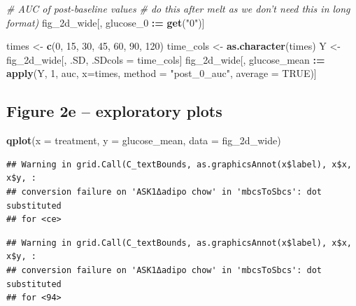 \documentclass[]{book}
\newenvironment{Shaded}{\begin{snugshade}}{\end{snugshade}}
\newcommand{\CommentTok}[1]{\textcolor[rgb]{0.56,0.35,0.01}{\textit{#1}}}
\newcommand{\DataTypeTok}[1]{\textcolor[rgb]{0.13,0.29,0.53}{#1}}
\newcommand{\DecValTok}[1]{\textcolor[rgb]{0.00,0.00,0.81}{#1}}
\newcommand{\ErrorTok}[1]{\textcolor[rgb]{0.64,0.00,0.00}{\textbf{#1}}}
\newcommand{\KeywordTok}[1]{\textcolor[rgb]{0.13,0.29,0.53}{\textbf{#1}}}
\newcommand{\NormalTok}[1]{#1}
\newcommand{\OperatorTok}[1]{\textcolor[rgb]{0.81,0.36,0.00}{\textbf{#1}}}
\newcommand{\OtherTok}[1]{\textcolor[rgb]{0.56,0.35,0.01}{#1}}
\newcommand{\StringTok}[1]{\textcolor[rgb]{0.31,0.60,0.02}{#1}}
\begin{document}
\begin{Shaded}
\begin{Highlighting}[]
\CommentTok{# AUC of post-baseline values}
\CommentTok{# do this after melt as we don't need this in long format)}
\NormalTok{fig_2d_wide[, glucose_}\DecValTok{0} \OperatorTok{:}\ErrorTok{=}\StringTok{ }\KeywordTok{get}\NormalTok{(}\StringTok{"0"}\NormalTok{)]}

\NormalTok{times <-}\StringTok{ }\KeywordTok{c}\NormalTok{(}\DecValTok{0}\NormalTok{, }\DecValTok{15}\NormalTok{, }\DecValTok{30}\NormalTok{, }\DecValTok{45}\NormalTok{, }\DecValTok{60}\NormalTok{, }\DecValTok{90}\NormalTok{, }\DecValTok{120}\NormalTok{)}
\NormalTok{time_cols <-}\StringTok{ }\KeywordTok{as.character}\NormalTok{(times)}
\NormalTok{Y <-}\StringTok{ }\NormalTok{fig_2d_wide[, .SD, .SDcols =}\StringTok{ }\NormalTok{time_cols]}
\NormalTok{fig_2d_wide[, glucose_mean }\OperatorTok{:}\ErrorTok{=}\StringTok{ }\KeywordTok{apply}\NormalTok{(Y, }\DecValTok{1}\NormalTok{, auc,}
                           \DataTypeTok{x=}\NormalTok{times,}
                           \DataTypeTok{method =} \StringTok{"post_0_auc"}\NormalTok{,}
                           \DataTypeTok{average =} \OtherTok{TRUE}\NormalTok{)]}
\end{Highlighting}
\end{Shaded}

\hypertarget{figure-2e-exploratory-plots}{%
\subsection{Figure 2e -- exploratory plots}\label{figure-2e-exploratory-plots}}

\begin{Shaded}
\begin{Highlighting}[]
\KeywordTok{qplot}\NormalTok{(}\DataTypeTok{x =}\NormalTok{ treatment, }\DataTypeTok{y =}\NormalTok{ glucose_mean, }\DataTypeTok{data =}\NormalTok{ fig_2d_wide)}
\end{Highlighting}
\end{Shaded}

\begin{verbatim}
## Warning in grid.Call(C_textBounds, as.graphicsAnnot(x$label), x$x, x$y, :
## conversion failure on 'ASK1Δadipo chow' in 'mbcsToSbcs': dot substituted
## for <ce>
\end{verbatim}

\begin{verbatim}
## Warning in grid.Call(C_textBounds, as.graphicsAnnot(x$label), x$x, x$y, :
## conversion failure on 'ASK1Δadipo chow' in 'mbcsToSbcs': dot substituted
## for <94>
\end{verbatim}
\end{document}

